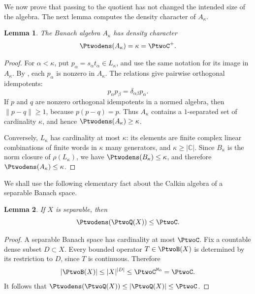 \documentclass[11pt,reqno]{amsart}
\makeatletter
\theoremstyle{plain}
\newtheorem{lemma}[lemma]{Lemma}
\theoremstyle{definition}
\newcommand{\C}{\mathbb C}
\newcounter{problempaper}
\newenvironment{problempaperbody}{%
  \setcounter{subsection}{0}%
  \setcounter{subsubsection}{0}%
  \setcounter{paragraph}{0}%
  \renewcommand{\thesubsection}{\arabic{subsection}}%
  \renewcommand{\thesubsubsection}{\thesubsection.\arabic{subsubsection}}%
  \renewcommand{\theparagraph}{\thesubsubsection.\arabic{paragraph}}%
  \let\problem@outersection\section
  \let\problem@outersubsection\subsection
  \let\problem@outersubsubsection\subsubsection
  \let\problem@outerparagraph\paragraph
  \let\section\problem@papersection
  \let\subsection\problem@papersubsection
  \let\subsubsection\problem@papersubsubsection
}{%
  \let\section\problem@outersection
  \let\subsection\problem@outersubsection
  \let\subsubsection\problem@outersubsubsection
  \let\paragraph\problem@outerparagraph
}
\newcommand{\problem@target}[2]{%
  \hypertarget{problem-\theproblempaper-#1-#2}{}%
}
\newcommand{\problem@paperheading}[3]{%
  \par\bigskip
  \problem@target{#1}{#2}%
  \noindent{\large\bfseries #2.\quad #3\par}%
  \nobreak\smallskip
}
\newcommand{\problem@papersubheading}[3]{%
  \par\medskip
  \problem@target{#1}{#2}%
  \noindent{\normalsize\bfseries #2.\quad #3\par}%
  \nobreak\smallskip
}
\newcommand{\problem@papersubsubheading}[3]{%
  \par\smallskip
  \problem@target{#1}{#2}%
  \noindent{\normalsize\itshape #2.\quad #3.\ }%
}
\def\problem@papersection{%
  \@ifstar{\problem@papersectionstar}{\problem@papersectionnostar}%
}
\def\problem@papersectionstar#1{%
  \par\bigskip\noindent{\large\bfseries #1\par}\nobreak\smallskip
}
\def\problem@papersectionnostar#1{%
  \refstepcounter{subsection}%
  \setcounter{subsubsection}{0}%
  \setcounter{paragraph}{0}%
  \problem@paperheading{section}{\thesubsection}{#1}%
  \problem@writecontentsline{section}{\thesubsection}{#1}%
}
\def\problem@papersubsection{%
  \@ifstar{\problem@papersubsectionstar}{\problem@papersubsectionnostar}%
}
\def\problem@papersubsectionstar#1{%
  \par\medskip\noindent{\normalsize\bfseries #1\par}\nobreak\smallskip
}
\def\problem@papersubsectionnostar#1{%
  \refstepcounter{subsubsection}%
  \setcounter{paragraph}{0}%
  \problem@papersubheading{subsection}{\thesubsubsection}{#1}%
  \problem@writecontentsline{subsection}{\thesubsubsection}{#1}%
}
\def\problem@papersubsubsection{%
  \@ifstar{\problem@papersubsubsectionstar}{\problem@papersubsubsectionnostar}%
}
\def\problem@papersubsubsectionstar#1{%
  \par\smallskip\noindent{\normalsize\itshape #1.\ }%
}
\def\problem@papersubsubsectionnostar#1{%
  \refstepcounter{paragraph}%
  \problem@papersubsubheading{subsubsection}{\theparagraph}{#1}%
  \problem@writecontentsline{subsubsection}{\theparagraph}{#1}%
}
\newcommand{\problem@writecontentsline}[3]{%
  \begingroup
  \protected@write\@auxout{}{%
    \string\problemcontentsentry{\theproblempaper}{#1}{#2}{#3}{\thepage}%
  }%
  \endgroup
}
\newcommand{\problemcontentsentry}[5]{%
  \@ifundefined{problemcontents@#1}{%
    \expandafter\gdef\csname problemcontents@#1\endcsname{}%
  }{}%
  \expandafter\g@addto@macro\csname problemcontents@#1\endcsname{%
    \problemcontentsline{#1}{#2}{#3}{#4}{#5}%
  }%
}
\newcommand{\problemcontentslink}[4]{%
  \hyperlink{problem-#1-#2-#3}{#4}%
}
\newcommand{\problemcontentsline}[5]{%
  \ifstrequal{#2}{section}{%
    \par\noindent
    \problemcontentslink{#1}{#2}{#3}{\makebox[2.5em][l]{#3}#4}%
    \nobreak\dotfill
    \problemcontentslink{#1}{#2}{#3}{#5}\par
  }{%
    \ifstrequal{#2}{subsection}{%
      \par\noindent\hspace*{1.5em}%
      \problemcontentslink{#1}{#2}{#3}{\makebox[3.5em][l]{#3}#4}%
      \nobreak\dotfill
      \problemcontentslink{#1}{#2}{#3}{#5}\par
    }{%
      \par\noindent\hspace*{3em}%
      \problemcontentslink{#1}{#2}{#3}{\makebox[4.5em][l]{#3}#4}%
      \nobreak\dotfill
      \problemcontentslink{#1}{#2}{#3}{#5}\par
    }%
  }%
}
\makeatother
\begin{document}
\begin{problempaperbody}
We now prove that passing to the quotient has not changed the intended size of the algebra. The next lemma computes the density character of $A_\kappa$.

\begin{lemma}
\label{p2-first:lem:density}
The Banach algebra $A_\kappa$ has density character
\begin{equation*}
        \Ptwodens(A_\kappa)=\kappa=\PtwoC^+.
\end{equation*}
\end{lemma}

\begin{proof}
For $\alpha<\kappa$, put $p_\alpha=s_\alpha t_\alpha\in L_\kappa$, and use the same notation for its image in $A_\kappa$. By , each $p_\alpha$ is nonzero in $A_\kappa$. The relations give pairwise orthogonal idempotents:
\begin{equation*}
        p_\alpha p_\beta=\delta_{\alpha\beta}p_\alpha.
\end{equation*}
If $p$ and $q$ are nonzero orthogonal idempotents in a normed algebra, then $\|p-q\|\geq1$, because $p(p-q)=p$. Thus $A_\kappa$ contains a $1$-separated set of cardinality $\kappa$, and hence $\Ptwodens(A_\kappa)\geq\kappa$.

Conversely, $L_\kappa$ has cardinality at most $\kappa$: its elements are finite complex linear combinations of finite words in $\kappa$ many generators, and $\kappa\geq|\C|$. Since $B_\kappa$ is the norm closure of $\rho(L_\kappa)$, we have $\Ptwodens(B_\kappa)\leq\kappa$, and therefore $\Ptwodens(A_\kappa)\leq\kappa$.
\end{proof}

We shall use the following elementary fact about the Calkin algebra of a separable Banach space.

\begin{lemma}
\label{p2-first:lem:separable-density}
If $X$ is separable, then
\begin{equation*}
        \Ptwodens(\PtwoQ(X))\leq\PtwoC.
\end{equation*}
\end{lemma}

\begin{proof}
A separable Banach space has cardinality at most $\PtwoC$. Fix a countable dense subset $D\subset X$. Every bounded operator $T\in\PtwoB(X)$ is determined by its restriction to $D$, since $T$ is continuous. Therefore
\begin{equation*}
        |\PtwoB(X)|\leq |X|^{|D|}\leq \PtwoC^{\aleph_0}=\PtwoC.
\end{equation*}
It follows that $\Ptwodens(\PtwoQ(X))\leq|\PtwoQ(X)|\leq\PtwoC$.
\end{proof}


\end{problempaperbody}
\end{document}
